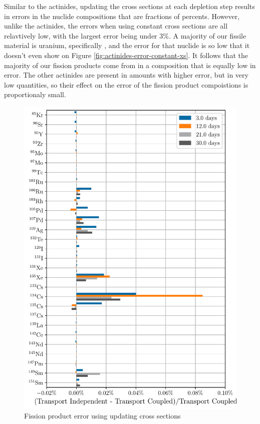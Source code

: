     Similar to the actinides, updating the cross sections at each depletion step
    results in errors in the nuclide compositions  that are fractions of
    percents. However, unlike the actinides, the errors when using constant
    cross sections are all relavtively low, with the largest error being under
    3\%. A majority of our fissile material is uranium, specifically
    , and the error for that nuclide is so low that it doesn't even
    show on Figure \ref{fig:actinides-error-constant-xs}. It follows that the
    majority of our fission products come from  in a composition
    that is equally low in error. The other actinides are present in amounts
    with higher error, but in very low quantities, so their effect on the error
    of the fission product compoistions is proportionaly small.
    
    \begin{figure}[htpb]
        \centering
        \includegraphics[width=\linewidth]{figs/fission_products_updating_xs_predictor_fission_q_days.pdf}
        \caption{Fission product error using  updating cross sections}
        \label{fig:fp-error-updating-xs}
    \end{figure}

